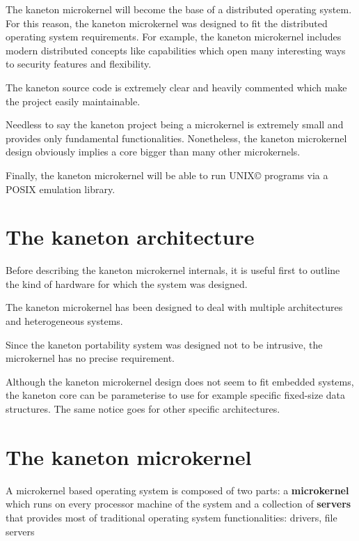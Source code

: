 \begin{multicols}{2}
The kaneton microkernel will become the base of a distributed operating
system. For this reason, the kaneton microkernel was designed to fit
the distributed operating system requirements. For example, the kaneton
microkernel includes modern distributed concepts like capabilities
which open many interesting ways to security features and flexibility.

The kaneton source code is extremely clear and heavily commented which
make the project easily maintainable.

Needless to say the kaneton project being a microkernel is extremely small
and provides only fundamental functionalities. Nonetheless, the kaneton
microkernel design obviously implies a core bigger than many other
microkernels.

Finally, the kaneton microkernel will be able to run
UNIX{\scriptsize \copyright} programs via a POSIX emulation library.

%
%

\section{The kaneton architecture}

Before describing the kaneton microkernel internals, it is useful first to
outline the kind of hardware for which the system was designed.

The kaneton microkernel has been designed to deal with multiple architectures
and heterogeneous systems.

Since the kaneton portability system was designed not to be intrusive, the
microkernel has no precise requirement.

Although the kaneton microkernel design does not seem to fit embedded
systems, the kaneton core can be parameterise to use for example specific
fixed-size data structures. The same notice goes for other specific
architectures.

%
%

\section{The kaneton microkernel}

A microkernel based operating system is composed of two parts:
a \textbf{microkernel} which runs on every processor machine of the system
and a collection of \textbf{servers} that provides most of traditional
operating system functionalities: drivers, file servers \etc{}


\end{multicols}
